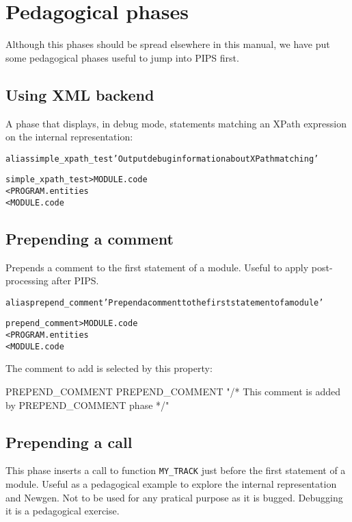 \documentclass[a4paper]{report}
\newenvironment{PipsMake}{\begin{alltt}}{\end{alltt}}
\newenvironment{PipsPass}[1]{\label{pass:#1}}{}
\begin{document}
\chapter{Pedagogical phases}
\label{cha:pedagogical-phases}

Although this phases should be spread elsewhere in this manual, we have
put some pedagogical phases useful to jump into PIPS first.


\section{Using XML backend}
\label{sec:using-xml-backend}

A phase that displays, in debug mode, statements matching an XPath
expression on the internal representation:

\begin{PipsMake}
alias simple_xpath_test 'Output debug information about XPath matching'

simple_xpath_test > MODULE.code
  < PROGRAM.entities
  < MODULE.code
\end{PipsMake}


\section{Prepending a comment}
\label{sec:prepending-comment}

\begin{PipsPass}{prepend_comment}
Prepends a comment to the first statement of a module.
Useful to apply post-processing after PIPS.
\end{PipsPass}

\begin{PipsMake}
alias prepend_comment 'Prepend a comment to the first statement of a module'

prepend_comment > MODULE.code
  < PROGRAM.entities
  < MODULE.code
\end{PipsMake}

The comment to add is selected by this property:
\begin{PipsProp}{PREPEND_COMMENT}
PREPEND_COMMENT "/* This comment is added by PREPEND_COMMENT phase */"
\end{PipsProp}

\section{Prepending a call}
\label{sec:prepending-call}

\begin{PipsPass}{prepend_call}
This phase inserts a call to function \verb/MY_TRACK/ just before the first statement of a module.
Useful as a pedagogical example to explore the internal representation
and Newgen. Not to be used for any pratical purpose as it is
bugged. Debugging it is a pedagogical exercise.
\end{PipsPass}
\end{document}
